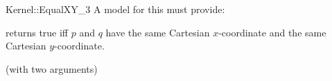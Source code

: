 \begin{ccRefFunctionObjectConcept}{Kernel::EqualXY_3}
A model for this must provide:


{returns true iff $p$ and $q$ have the same Cartesian $x$-coordinate
and the same Cartesian $y$-coordinate.}

\ccRefines
{} (with two arguments)

\ccSeeAlso
{}\\

\end{ccRefFunctionObjectConcept}

